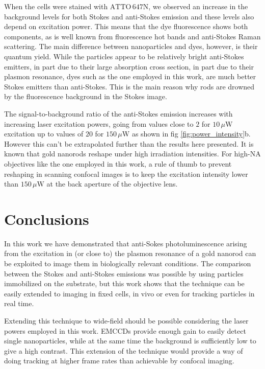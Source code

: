 \documentclass[journal=nalefd,manuscript=letter]{achemso}
\newcommand{\uW}{\ensuremath{\,\mu\textrm{W}}}
\newcommand{\atto}{\ensuremath{\textrm{ATTO}\,647\textrm{N}}}
\begin{document}
When the cells were stained with \atto, we observed an increase in the
background levels for both Stokes and anti-Stokes emission and these levels also
depend on excitation power. This means that the dye fluorescence shows both components, as is well known from fluorescence hot bands and anti-Stokes Raman scattering. The main difference between nanoparticles and dyes, however, is their quantum yield.
While the particles appear to be relatively bright anti-Stokes emitters, in part
due to their large absorption cross section, in part due to their plasmon resonance, dyes such as the one
employed in this work, are much better Stokes emitters than anti-Stokes. This is
the main reason why rods are drowned by the fluorescence background in the Stokes image.

The signal-to-background ratio of the anti-Stokes emission increases with
increasing laser excitation powers, going from values close to $2$ for $10\uW$
excitation up to values of $20$ for $150\uW$ as shown in fig
\ref{fig:power_intensity}b. However this can't be extrapolated further than the
results here presented. It is known that gold nanorods reshape under high
irradiation intensities. For high-NA objectives like the one employed in this
work, a rule of thumb to prevent reshaping in scanning confocal images is to keep the excitation intensity lower than $150\uW$ at the back aperture of the objective lens.

\section{Conclusions}
In this work we have demonstrated that anti-Sokes photoluminescence arising from the
excitation in (or close to) the plasmon resonance of a gold nanorod can be
exploited to image\cite{Jiang2013} them in biologically relevant conditions. The
comparison between the Stokes and anti-Stokes emissions was possible by using particles
immobilized on the substrate, but this work shows that the technique can be
easily extended to imaging in fixed cells, in vivo or even for tracking
particles in real time\cite{VandenBroek2013}.

Extending this technique to wide-field should be possible considering the laser
powers employed in this work. EMCCDs provide enough gain\cite{Dussault2004} to
easily detect single nanoparticles, while at the same time the background is
sufficiently low to give a high contrast. This extension of the technique would
provide a way of doing tracking at higher frame rates than achievable by
confocal imaging.
\end{document}
